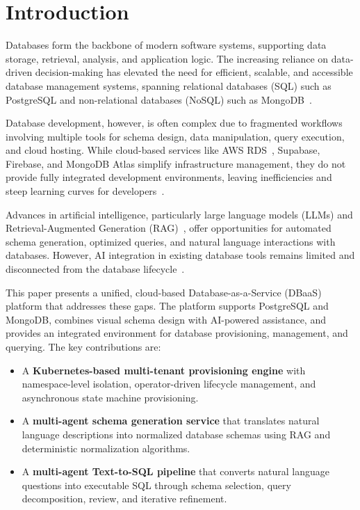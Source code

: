 \documentclass[twoside,twocolumn,10pt]{article}
\begin{document}
\section{Introduction}
\fontsize{11}{13}\selectfont

Databases form the backbone of modern software systems, supporting data storage, retrieval, analysis, and application logic. The increasing reliance on data-driven decision-making has elevated the need for efficient, scalable, and accessible database management systems, spanning relational databases (SQL) such as PostgreSQL and non-relational databases (NoSQL) such as MongoDB~\cite{codd1970}.

Database development, however, is often complex due to fragmented workflows involving multiple tools for schema design, data manipulation, query execution, and cloud hosting. While cloud-based services like AWS RDS~\cite{aws_rds_provisioning}, Supabase, Firebase, and MongoDB Atlas simplify infrastructure management, they do not provide fully integrated development environments, leaving inefficiencies and steep learning curves for developers~\cite{Comparison_of_dbaas_architectures, Database_as_a_service}.

Advances in artificial intelligence, particularly large language models (LLMs) and Retrieval-Augmented Generation (RAG)~\cite{lewis20}, offer opportunities for automated schema generation, optimized queries, and natural language interactions with databases. However, AI integration in existing database tools remains limited and disconnected from the database lifecycle~\cite{Text_to_SQL_Survey}.

This paper presents a unified, cloud-based Database-as-a-Service (DBaaS) platform that addresses these gaps. The platform supports PostgreSQL and MongoDB, combines visual schema design with AI-powered assistance, and provides an integrated environment for database provisioning, management, and querying. The key contributions are:

\begin{itemize}
    \item A \textbf{Kubernetes-based multi-tenant provisioning engine} with namespace-level isolation, operator-driven lifecycle management, and asynchronous state machine provisioning.
    \item A \textbf{multi-agent schema generation service} that translates natural language descriptions into normalized database schemas using RAG and deterministic normalization algorithms.
    \item A \textbf{multi-agent Text-to-SQL pipeline} that converts natural language questions into executable SQL through schema selection, query decomposition, review, and iterative refinement.
\end{itemize}
\end{document}
